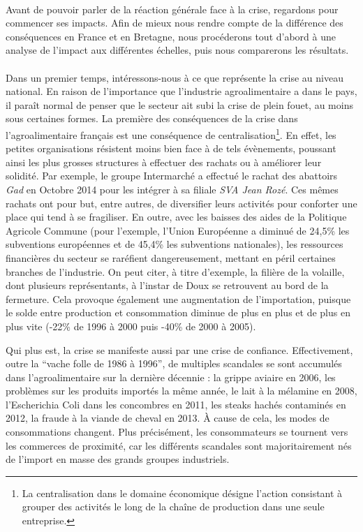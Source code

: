 \documentclass[a4paper,12pt]{report}
\begin{document}
			\paragraph{}Avant de pouvoir parler de la réaction générale face à la crise, regardons pour commencer ses impacts. Afin de mieux nous rendre compte de la différence des conséquences en France et en Bretagne, nous procéderons tout d'abord à une analyse de l'impact aux différentes échelles, puis nous comparerons les résultats.

			\paragraph{}Dans un premier temps, intéressons-nous à ce que représente la crise au niveau national. En raison de l'importance que l'industrie agroalimentaire a dans le pays, il paraît normal de penser que le secteur ait subi la crise de plein fouet, au moins sous certaines formes. La première des conséquences de la crise dans l'agroalimentaire français est une conséquence de centralisation\footnote{La centralisation dans le domaine économique désigne l'action consistant à grouper des activités le long de la chaîne de production dans une seule entreprise.}. En effet, les petites organisations résistent moins bien face à de tels évènements, poussant ainsi les plus grosses structures à effectuer des rachats ou à améliorer leur solidité. Par exemple, le groupe Intermarché a effectué le rachat des abattoirs \textit{Gad} en Octobre 2014 pour les intégrer à sa filiale \textit{SVA Jean Rozé}. Ces mêmes rachats ont pour but, entre autres, de diversifier leurs activités pour conforter une place qui tend à se fragiliser. En outre, avec les baisses des aides de la Politique Agricole Commune (pour l’exemple, l’Union Européenne a diminué de 24,5\% les subventions européennes et de 45,4\% les subventions nationales), les ressources financières du secteur se raréfient dangereusement, mettant en péril certaines branches de l’industrie. On peut citer, à titre d’exemple, la filière de la volaille, dont plusieurs représentants, à l’instar de Doux se retrouvent au bord de la fermeture. Cela provoque également une augmentation de l’importation, puisque le solde entre production et consommation diminue de plus en plus et de plus en plus vite (-22\% de 1996 à 2000 puis -40\% de 2000 à 2005)\cite{AvenirExploitationVolailleBretonne}.

			Qui plus est, la crise se manifeste aussi par une crise de confiance. Effectivement, outre la “vache folle de 1986 à 1996”, de multiples scandales se sont accumulés dans l’agroalimentaire sur la dernière décennie\cite{Scandales} : la grippe aviaire en 2006, les problèmes sur les produits importés la même année, le lait à la mélamine en 2008, l’Escherichia Coli dans les concombres en 2011, les steaks hachés contaminés en 2012, la fraude à la viande de cheval en 2013. À cause de cela, les modes de consommations changent. Plus précisément, les consommateurs se tournent vers les commerces de proximité, car les différents scandales sont majoritairement nés de l’import en masse des grands groupes industriels.
			
\end{document}
